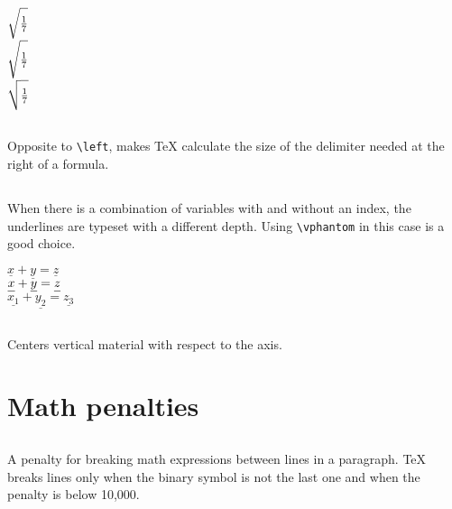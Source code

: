 \begin{table}[htb]
\begin{LTXexample}[width=0.2\linewidth]
\def\mySqrt{\radical"0270372\relax}
$ \mySqrt{\frac{1}{7}} $\\[5pt]

\def\mySqrt{\radical"0270373\relax}
$ \mySqrt{\frac{1}{7}} $\\[5pt]

\def\mySqrt{\radical"0270374\relax}
$ \mySqrt{\frac{1}{7}} $\\[5pt]
\end{LTXexample}

\subsection{}
Opposite to \verb+\left+, makes \TeX{} calculate the size of the 
delimiter needed at the right of a formula.

\subsection{}\label{subsec:underline}
When there is a combination of variables with and without an index, the underlines are typeset    %
with a different depth. Using \verb+\vphantom+ in this case is a good choice. 

\begin{LTXexample}[width=0.2\linewidth]
$\underline{x}+\underline{y}=\underline{z}$\\

\let\ul\underline
\def\yPh{\vphantom{y}}
$ \ul{x\yPh} + \ul{y} = \ul{z\yPh} $\\

$ \ul{x_1} + \ul{y_2} = \ul{z_3} $
\end{LTXexample}

\subsection{}
Centers vertical material with respect to the axis.


\section{Math penalties}

\subsection{}
A penalty for  breaking math expressions between lines in a paragraph. TeX breaks lines only
when the binary symbol is not the last one and when the penalty is below 10,000.


\end{table}
